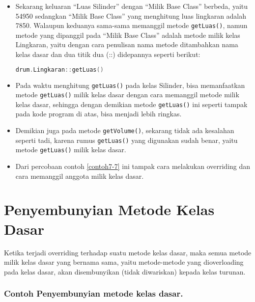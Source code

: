 \begin{itemize}
\item
  Sekarang keluaran ``Luas Silinder'' dengan ``Milik Base Class''
  berbeda, yaitu 54950 sedangkan ``Milik Base Class'' yang menghitung
  luas lingkaran adalah 7850. Walaupun keduanya sama-sama memanggil
  metode \texttt{getLuas()}, namun metode yang dipanggil pada ``Milik
  Base Class'' adalah metode milik kelas Lingkaran, yaitu dengan cara
  penulisan nama metode ditambahkan nama kelas dasar dan dua titik dua
  (::) didepannya seperti berikut:

\begin{lstlisting}[language=c++, numbers=none]
drum.Lingkaran::getLuas()
\end{lstlisting}
\item
  Pada waktu menghitung \texttt{getLuas()} pada kelas Silinder, bisa
  memanfaatkan metode \texttt{getLuas()} milik kelas dasar dengan cara
  memanggil metode milik kelas dasar, sehingga dengan demikian metode
  \texttt{getLuas()} ini seperti tampak pada kode program di atas, bisa
  menjadi lebih ringkas.
\item
  Demikian juga pada metode \texttt{getVolume()}, sekarang tidak ada
  kesalahan seperti tadi, karena rumus \texttt{getLuas()} yang digunakan
  sudah benar, yaitu metode \texttt{getLuas()} milik kelas dasar.
\item
  Dari percobaan contoh \ref{contoh7-7} ini tampak cara melakukan overriding dan cara
  memanggil anggota milik kelas dasar.
\end{itemize}

\section{Penyembunyian Metode Kelas Dasar}\label{penyembunyian-metode-kelas-dasar}

Ketika terjadi overriding terhadap suatu metode kelas dasar, maka semua
metode milik kelas dasar yang bernama sama, yaitu metode-metode yang
dioverloading pada kelas dasar, akan disembunyikan (tidak diwariskan)
kepada kelas turunan.

\subsubsection*{Contoh Penyembunyian metode kelas dasar.}

